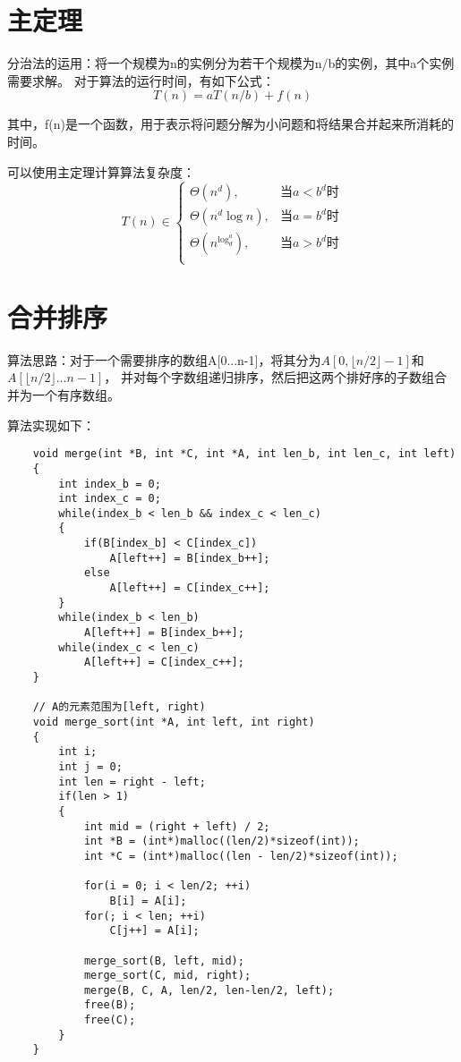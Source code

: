 \documentclass[a4paper,left=2.5cm,right=2.5cm,11pt]{article}
\begin{document}
\tableofcontents

\clearpage

\section{主定理}
	分治法的运用：将一个规模为n的实例分为若干个规模为n/b的实例，其中a个实例需要求解。
	对于算法的运行时间，有如下公式：
	\begin{equation}
		T(n) = aT(n/b) + f(n)
	\end{equation}

	其中，f(n)是一个函数，用于表示将问题分解为小问题和将结果合并起来所消耗的时间。\par

	可以使用主定理计算算法复杂度：
	\begin{equation}
	T(n) \in
		\begin{cases}
			\Theta(n^d), &\text{当}a<b^d\text{时}\\
			\Theta(n^d \log n), &\text{当}a=b^d\text{时}\\
			\Theta(n^{\log_d^a}), &\text{当}a>b^d\text{时}\\
		\end{cases}
	\end{equation}

\section{合并排序}
	算法思路：对于一个需要排序的数组A[0...n-1]，将其分为$A[0, \lfloor n/2 \rfloor-1]$和$A[\lfloor n/2 \rfloor ... n-1]$，
	并对每个字数组递归排序，然后把这两个排好序的子数组合并为一个有序数组。\par

	算法实现如下：
	\begin{lstlisting}
	void merge(int *B, int *C, int *A, int len_b, int len_c, int left)
	{
		int index_b = 0;
		int index_c = 0;
		while(index_b < len_b && index_c < len_c)
		{
			if(B[index_b] < C[index_c])
				A[left++] = B[index_b++];
			else
				A[left++] = C[index_c++];
		}
		while(index_b < len_b)
			A[left++] = B[index_b++];
		while(index_c < len_c)
			A[left++] = C[index_c++];
	}

	// A的元素范围为[left, right)
	void merge_sort(int *A, int left, int right)
	{
		int i;
		int j = 0;
		int len = right - left;
		if(len > 1)
		{
			int mid = (right + left) / 2;
			int *B = (int*)malloc((len/2)*sizeof(int));
			int *C = (int*)malloc((len - len/2)*sizeof(int));

			for(i = 0; i < len/2; ++i)
				B[i] = A[i];
			for(; i < len; ++i)
				C[j++] = A[i];

			merge_sort(B, left, mid);
			merge_sort(C, mid, right);
			merge(B, C, A, len/2, len-len/2, left);
			free(B);
			free(C);
		}
	}
	\end{lstlisting}
\end{document}
